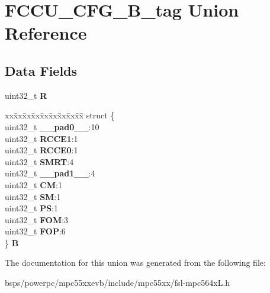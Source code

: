 \hypertarget{unionFCCU__CFG__32B__tag}{}\section{F\+C\+C\+U\+\_\+\+C\+F\+G\+\_\+B\+\_\+tag Union Reference}
\label{unionFCCU__CFG__32B__tag}
\subsection*{Data Fields}
\begin{DoxyCompactItemize}
\item 
\mbox{\label{unionFCCU__CFG__32B__tag_a0447b602a29b0ac653524b71352b2a55}} 
uint32\+\_\+t {\bfseries R}
\item 
\mbox{\label{unionFCCU__CFG__32B__tag_a9fa0c736748aa4b5cceaa278ead56cfe}} 
\begin{tabbing}
xx\=xx\=xx\=xx\=xx\=xx\=xx\=xx\=xx\=\kill
struct \{\\
\>uint32\_t {\bfseries \_\_pad0\_\_}:10\\
\>uint32\_t {\bfseries RCCE1}:1\\
\>uint32\_t {\bfseries RCCE0}:1\\
\>uint32\_t {\bfseries SMRT}:4\\
\>uint32\_t {\bfseries \_\_pad1\_\_}:4\\
\>uint32\_t {\bfseries CM}:1\\
\>uint32\_t {\bfseries SM}:1\\
\>uint32\_t {\bfseries PS}:1\\
\>uint32\_t {\bfseries FOM}:3\\
\>uint32\_t {\bfseries FOP}:6\\
\} {\bfseries B}\\

\end{tabbing}\end{DoxyCompactItemize}


The documentation for this union was generated from the following file\+:\begin{DoxyCompactItemize}
\item 
bsps/powerpc/mpc55xxevb/include/mpc55xx/fsl-\/mpc564x\+L.\+h\end{DoxyCompactItemize}
